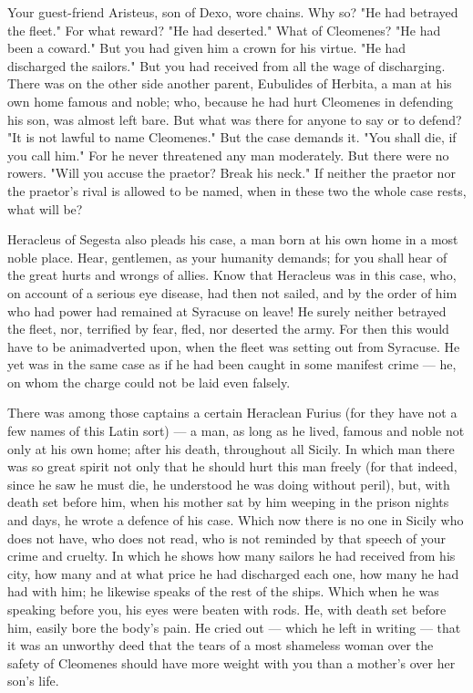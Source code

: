  Your guest-friend Aristeus, son of Dexo, wore chains. Why so? "He had betrayed the fleet." For what reward? "He had deserted." What of Cleomenes? "He had been a coward." But you had given him a crown for his virtue. "He had discharged the sailors." But you had received from all the wage of discharging. There was on the other side another parent, Eubulides of Herbita, a man at his own home famous and noble; who, because he had hurt Cleomenes in defending his son, was almost left bare. But what was there for anyone to say or to defend? "It is not lawful to name Cleomenes." But the case demands it. "You shall die, if you call him." For he never threatened any man moderately. But there were no rowers. "Will you accuse the praetor? Break his neck." If neither the praetor nor the praetor's rival is allowed to be named, when in these two the whole case rests, what will be?

 Heracleus of Segesta also pleads his case, a man born at his own home in a most noble place. Hear, gentlemen, as your humanity demands; for you shall hear of the great hurts and wrongs of allies. Know that Heracleus was in this case, who, on account of a serious eye disease, had then not sailed, and by the order of him who had power had remained at Syracuse on leave! He surely neither betrayed the fleet, nor, terrified by fear, fled, nor deserted the army. For then this would have to be animadverted upon, when the fleet was setting out from Syracuse. He yet was in the same case as if he had been caught in some manifest crime --- he, on whom the charge could not be laid even falsely.

 There was among those captains a certain Heraclean Furius (for they have not a few names of this Latin sort) --- a man, as long as he lived, famous and noble not only at his own home; after his death, throughout all Sicily. In which man there was so great spirit not only that he should hurt this man freely (for that indeed, since he saw he must die, he understood he was doing without peril), but, with death set before him, when his mother sat by him weeping in the prison nights and days, he wrote a defence of his case. Which now there is no one in Sicily who does not have, who does not read, who is not reminded by that speech of your crime and cruelty. In which he shows how many sailors he had received from his city, how many and at what price he had discharged each one, how many he had had with him; he likewise speaks of the rest of the ships. Which when he was speaking before you, his eyes were beaten with rods. He, with death set before him, easily bore the body's pain. He cried out --- which he left in writing --- that it was an unworthy deed that the tears of a most shameless woman over the safety of Cleomenes should have more weight with you than a mother's over her son's life.

